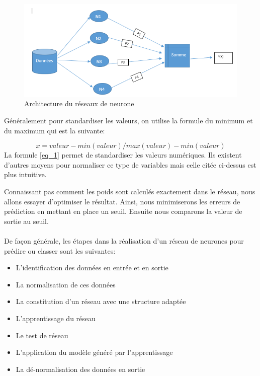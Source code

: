 \documentclass[11pt,a4paper]{report}
\begin{document}
  \begin{figure}[h]
   \centering
   \includegraphics[scale=0.70]{structure_reseaux.PNG}
     \caption{Architecture du réseaux de neurone}
     \label{reseaux}
\end{figure}
\newpage
Généralement pour standardiser les valeurs, on utilise la formule du minimum et du maximum qui est la suivante:

\begin{equation}
  x= valeur - min(valeur)/max(valeur) - min(valeur)
\label{eq_1}
\end{equation}
 La formule \ref{eq_1} permet de standardiser les valeurs numériques. Ils existent d'autres moyens pour normaliser ce type de variables mais celle citée ci-dessus est plus intuitive. 
  

Connaissant pas comment les poids sont calculés exactement dans le réseau, nous allons essayer d'optimiser le résultat. Ainsi,  nous minimiserons les erreurs de prédiction en mettant en place un seuil. Ensuite nous comparons la valeur de sortie au seuil.\\\\

De façon générale, les étapes dans la réalisation d'un réseau de neurones pour prédire ou classer sont les suivantes: 
\begin{itemize}
\item L'identification des données en entrée et en sortie
\item La normalisation de ces données 
\item La constitution d'un réseau avec une structure adaptée
\item L'apprentissage du réseau 
\item Le test de réseau 
\item L'application du modèle généré par l'apprentissage
\item La dé-normalisation des données en sortie 
\end{itemize}
\end{document}
